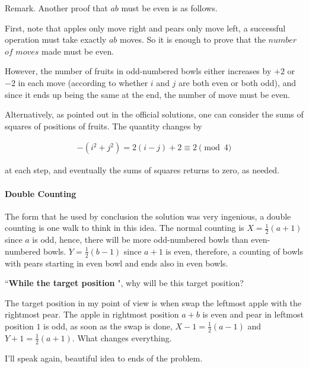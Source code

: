 \documentclass[11pt]{scrartcl}
\begin{document}
\begin{remark}[Evan]
Remark. Another proof that $ab$ must be even is as follows.\par
First, note that apples only move right and pears only move left, a successful operation must take exactly $ab$ moves.
So it is enough to prove that the $number$ $of$ $moves$ made must be even.\par
However, the number of fruits in odd-numbered
bowls either increases by $+2$ or $-2$ in each move (according to whether $i$ and $j$ are both even or both odd), and
since it ends up being the same at the end, the number of move must be even.\par
Alternatively, as pointed out in the official solutions, one can consider the
sums of squares of positions of fruits. The quantity changes by\par

\begin{align*}
  [(i+1)^2+(j-1)^2] - (i^2+j^2) = 2(i-j) + 2 \equiv 2 \pmod{4}
\end{align*}

at each step, and eventually the sums of squares returns to zero, as needed.
\end{remark}

\paragraph{Double Counting} The form that he used by conclusion the solution was very ingenious, a double counting is
one walk to think in this idea. The normal counting is $X=\frac{1}{2}(a+1)$ since $a$ is odd, hence, there will be more
odd-numbered bowls than even-numbered bowls. $Y=\frac{1}{2}(b-1)$ since $a+1$ is even, therefore, a counting of bowls
with pears starting in even bowl and ends also in even bowls. \par
``{\textbf{While the target position}} ", why will be this target position?\par
The target position in my point of view is when swap the leftmost apple with the rightmost pear. The apple in rightmost
position $a+b$ is even and pear in leftmost position $1$ is odd, as soon as the swap is done, $X-1=\frac{1}{2}(a-1)$
and $Y+1=\frac{1}{2}(a+1)$. What changes everything.\par
I'll speak again, beautiful idea to ends of the problem.
\end{document}
